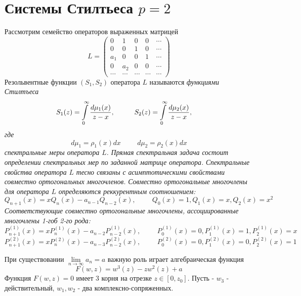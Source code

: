 \documentclass[12pt, a4paper]{report}
\begin{document}
\section{Системы Стилтьеса $p=2$}
Рассмотрим семейство операторов выраженных матрицей
\begin{equation}
L = \left(\begin{array}{ccccccc}
0 & 1 & 0 & 0 & \cdots \\
0 & 0 & 1 & 0 & \cdots \\
a_1 & 0 & 0 & 1 & \cdots \\
0 & a_2 & 0 & 0 & \cdots \\
\cdots & \cdots & \cdots & \cdots & \cdots 
\end{array}\right)
\end{equation}
Резольвентные функции $(S_1,S_2)$ оператора $L$ называются \it функциями Стилтъеса \rm 
$$
S_1(z) = \int\limits_{0}^{\infty} \frac{d\mu_1(x)}{z-x}, \hspace{1 cm} 
S_2(z) = \int\limits_{0}^{\infty} \frac{d\mu_2(x)}{z-x}, \hspace{0.5cm} 
$$
где 
$$
d\mu_1 = \rho_1(x) dx \hspace{1cm} d\mu_2 = \rho_2(x) dx
$$ 
спектральные меры оператора $L$.
Прямая спектральная задача состоит определении спектральных мер по заданной матрице оператора. 
Спектральные свойства оператора $L$ тесно связаны с асимптотическими свойствами совместно ортогональных многочленов. Совместно ортогональные многочлены для оператора  $L$ определяются реккурентным соотношением:
$$
Q_{n+1}(x)=xQ_n(x)-a_{n-1}Q_{n-2}(x), \hspace{1cm} Q_0(x)=1, Q_1(x)=x, Q_2(x)=x^2
$$
Соответствующие совместно ортогональные многочлены, ассоциированные многочлены 1-гоб 2-го рода:
$$
P^{(1)}_{n+1}(x)=xP^{(1)}_n(x)-a_{n-2}P^{(1)}_{n-2}(x), \hspace{1cm} P^{(1)}_0(x)=0, P^{(1)}_1(x)=1, P^{(1)}_2(x)=x
$$
$$
P^{(2)}_{n+1}(x)=xP^{(2)}_n(x)-a_{n-3}P^{(2)}_{n-2}(x), \hspace{1cm} P^{(2)}_0(x)=0, P^{(2)}_1(x)=0, P^{(2)}_2(x)=1
$$

При существовании $\lim \limits_{n \rightarrow \infty} a_n=a$ важную роль играет алгебраическая функция
$$
F(w,z)=w^3(z)-zw^2(z)+a 
$$
Функция $F(w,z)=0$ имеет 3 корня на отрезке $z\in [0, z_0]$. Пусть - $w_3$ - действительный, $w_1, w_2$ - два комплексно-сопряженных.
\end{document}
